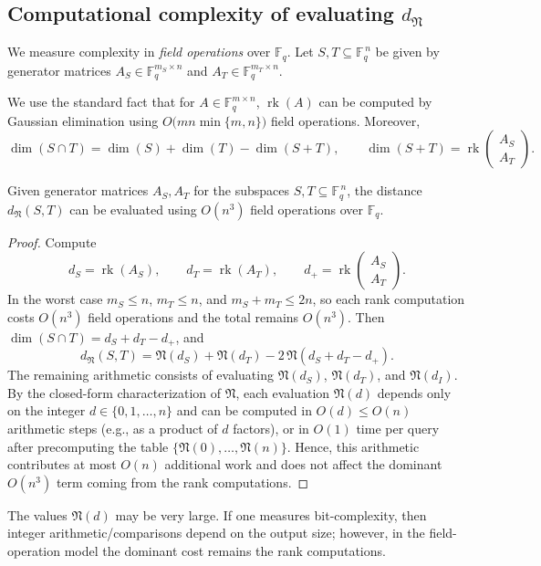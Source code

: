 \documentclass{svproc}
\DeclareMathOperator{\rk}{rk}
\begin{document}
\subsection{Computational complexity of evaluating $d_{\mathfrak N}$}

We measure complexity in \emph{field operations} over $\mathbb{F}_q$.
Let $S,T \subseteq \mathbb{F}_q^{\,n}$ be given by generator matrices
$A_S \in \mathbb{F}_q^{m_S\times n}$ and $A_T \in \mathbb{F}_q^{m_T\times n}$.

We use the standard fact that for $A\in\mathbb{F}_q^{m\times n}$,
$\rk(A)$ can be computed by Gaussian elimination using
$O\!\big(mn\min\{m,n\}\big)$ field operations. Moreover,
\[
\dim(S\cap T)=\dim(S)+\dim(T)-\dim(S+T),
\qquad
\dim(S+T)=\rk\!\begin{pmatrix}A_S\\A_T\end{pmatrix}.
\]

\begin{proposition}
Given generator matrices $A_S,A_T$ for the subspaces $S,T\subseteq \mathbb{F}_q^{\,n}$,
the distance $d_{\mathfrak N}(S,T)$ can be evaluated using $O(n^3)$
field operations over $\mathbb{F}_q$.
\end{proposition}

\begin{proof}
Compute
\[
d_S=\rk(A_S),\qquad d_T=\rk(A_T),\qquad
d_+=\rk\!\begin{pmatrix}A_S\\A_T\end{pmatrix}.
\]
In the worst case $m_S\le n$, $m_T\le n$, and $m_S+m_T\le 2n$, so each rank
computation costs $O(n^3)$ field operations and the total remains $O(n^3)$.
Then $\dim(S\cap T)=d_S+d_T-d_+$, and
\[
d_{\mathfrak N}(S,T)=\mathfrak N(d_S)+\mathfrak N(d_T)-2\,\mathfrak N(d_S+d_T-d_+).
\]
The remaining arithmetic consists of evaluating $\mathfrak{N}(d_S)$, $\mathfrak{N}(d_T)$, and $\mathfrak{N}(d_I)$. By the closed-form characterization of $\mathfrak{N}$, each evaluation $\mathfrak{N}(d)$ depends only on the integer $d \in \{0,1,\dots,n\}$ and can be computed in $O(d)\le O(n)$ arithmetic steps (e.g., as a product of $d$ factors), or in $O(1)$ time per query after precomputing the table $\{\mathfrak{N}(0),\dots,\mathfrak{N}(n)\}$. Hence, this arithmetic contributes at most $O(n)$ additional work and does not affect the dominant $O(n^3)$ term coming from the rank computations.
\end{proof}


The values $\mathfrak N(d)$ may be very large. If one measures bit-complexity,
then integer arithmetic/comparisons depend on the output size; however, in the
field-operation model the dominant cost remains the rank computations.
\end{document}
